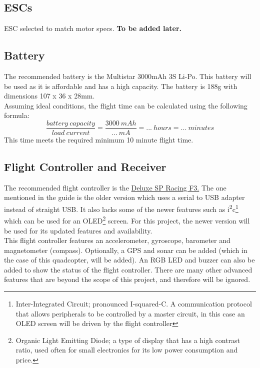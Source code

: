 \documentclass[12pt]{article}
\begin{document}
\subsection{ESCs}
ESC selected to match motor specs. \textbf{To be added later.}

\subsection{Battery}
The recommended battery is the Multistar 3000mAh 3S Li-Po. This battery will be used as it is affordable and has a high capacity. The battery is 188g with dimensions 107 x 36 x 28mm. 
\\

Assuming ideal conditions, the flight time can be calculated using the following formula:
\\

\begin{equation} 
\frac{battery\ capacity}{load\ current} = \frac{3000\ mAh}{...\ mA} = ...\ hours = ...\ minutes
\end{equation}
This time meets the required minimum 10 minute flight time.

\subsection{Flight Controller and Receiver}
The recommended flight controller is the \href{https://www.banggood.com/Upgrade-NAZE32-F3-Flight-Controller-Acro-6-DOF-Deluxe-10-DOF-for-Multirotor-Racing-p-1010232.html?ID=17&cur_warehouse=CN}{\color{cyan}Deluxe SP Racing F3.} The one mentioned in the guide is the older version which uses a serial to USB adapter instead of straight USB. It also lacks some of the newer features such as i\textsuperscript{2}c\footnote{Inter-Integrated Circuit; pronounced I-squared-C. A communication protocol that allows peripherals to be controlled by a master circuit, in this case an OLED screen will be driven by the flight controller} which can be used for an OLED\footnote{Organic Light Emitting Diode; a type of display that has a high contrast ratio, used often for small electronics for its low power consumption and price.} screen. For this project, the newer version will be used for its updated features and availability.
\\

This flight controller features an accelerometer, gyroscope, barometer and magnetometer (compass). Optionally, a GPS and sonar can be added (which in the case of this quadcopter, will be added). An RGB LED and buzzer can also be added to show the status of the flight controller. There are many other advanced features that are beyond the scope of this project, and therefore will be ignored.
\\
\end{document}
